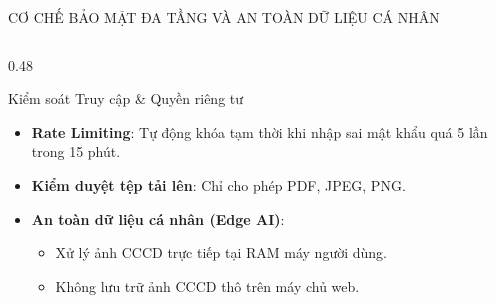 \documentclass[aspectratio=169, 10pt]{beamer}
\begin{document}
\begin{frame}{CƠ CHẾ BẢO MẬT ĐA TẦNG VÀ AN TOÀN DỮ LIỆU CÁ NHÂN}
\begin{columns}[T]
    \begin{column}{0.48\textwidth}
      \begin{greenCard}{Kiểm soát Truy cập \& Quyền riêng tư}
        \fontsize{6.8pt}{8.5pt}\selectfont
        \begin{itemize}
          \setlength{\itemsep}{1.2pt}
          \item \textbf{Rate Limiting}: Tự động khóa tạm thời khi nhập sai mật khẩu quá 5 lần trong 15 phút.
          \item \textbf{Kiểm duyệt tệp tải lên}: Chỉ cho phép PDF, JPEG, PNG.
          \item \textbf{An toàn dữ liệu cá nhân (Edge AI)}:
                \begin{itemize}
                  \item Xử lý ảnh CCCD trực tiếp tại RAM máy người dùng.
                  \item Không lưu trữ ảnh CCCD thô trên máy chủ web.
                \end{itemize}
        \end{itemize}
      \end{greenCard}
    \end{column}
  \end{columns}
\end{frame}
\end{document}
